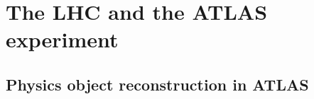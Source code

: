 
\chapter{The LHC and the ATLAS experiment} %
\label{Chapter2} 

\section{Physics object reconstruction in ATLAS}
\label{sec:physics_object_reconstruction}
